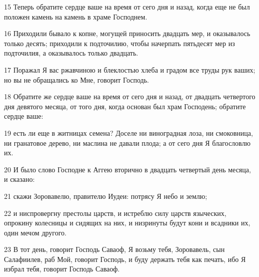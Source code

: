 \par 15 Теперь обратите сердце ваше на время от сего дня и назад, когда еще не был положен камень на камень в храме Господнем.
\par 16 Приходили бывало к копне, могущей приносить двадцать мер, и оказывалось только десять; приходили к подточилию, чтобы начерпать пятьдесят мер из подточилия, а оказывалось только двадцать.
\par 17 Поражал Я вас ржавчиною и блеклостью хлеба и градом все труды рук ваших; но вы не обращались ко Мне, говорит Господь.
\par 18 Обратите же сердце ваше на время от сего дня и назад, от двадцать четвертого дня девятого месяца, от того дня, когда основан был храм Господень; обратите сердце ваше:
\par 19 есть ли еще в житницах семена? Доселе ни виноградная лоза, ни смоковница, ни гранатовое дерево, ни маслина не давали плода; а от сего дня Я благословлю их.
\par 20 И было слово Господне к Аггею вторично в двадцать четвертый день месяца, и сказано:
\par 21 скажи Зоровавелю, правителю Иудеи: потрясу Я небо и землю;
\par 22 и ниспровергну престолы царств, и истреблю силу царств языческих, опрокину колесницы и сидящих на них, и низринуты будут кони и всадники их, один мечом другого.
\par 23 В тот день, говорит Господь Саваоф, Я возьму тебя, Зоровавель, сын Салафиилев, раб Мой, говорит Господь, и буду держать тебя как печать, ибо Я избрал тебя, говорит Господь Саваоф.


